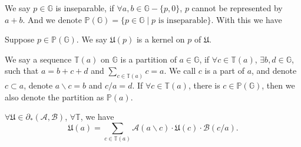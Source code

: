 We say $p \in\mathbb{G}$ is inseparable, if $\forall a, b \in\mathbb{G}-\{p, 0\}$, $p$ cannot be represented by $a + b$.
And we denote $\mathbb{P}(\mathbb{G}) = \{ p \in\mathbb{G} \mid p \text{ is inseparable}\}$. With this we have
\begin{definition}
    Suppose $p \in \mathbb{P}(\mathbb{G})$. We say $\mathfrak{U}(p)$ is a kernel on $p$ of $\mathfrak{U}$.
\end{definition}
\begin{definition}
    We say a sequence $\mathbb{T}(a)$ on $\mathbb{G}$ is a partition of $a \in \mathbb{G}$, if $\forall c \in \mathbb{T}(a)$, $\exists b, d \in \mathbb{G}$, such that $a = b + c + d$ and $\sum_{c\in \mathbb{T}(a)}c = a$.  We call $c$ is a part of $a$, and denote $c\subset a$, denote $a\backslash c = b$ and $c/a = d$. If $\forall c \in \mathbb{T}(a)$, there is $c\in\mathbb{P}(\mathbb{G})$, then we also denote the partition as $\mathbb{P}(a)$.
\end{definition}
\begin{theorem}
    $\forall \mathfrak{U} \in \partial_{*}(\mathcal{A}, \mathcal{B})$, $\forall \mathbb{T}$, we have
    \[ \mathfrak{U}(a) = \sum_{c \in \mathbb{T}(a)}\mathcal{A}(a\backslash c)\cdot\mathfrak{U}(c)\cdot\mathcal{B}(c/a). \]
\end{theorem}
